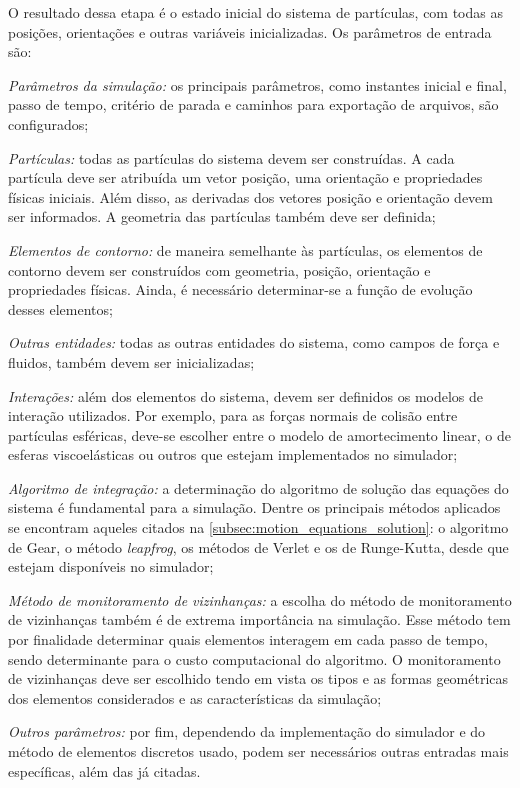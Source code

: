 O resultado dessa etapa é o estado inicial do sistema de partículas, com todas as posições, orientações e outras variáveis inicializadas. Os parâmetros de entrada são:
\begin{alineas}
\item \textit{Parâmetros da simulação:} os principais parâmetros, como instantes inicial e final, passo de tempo, critério de parada e caminhos para exportação de arquivos, são configurados;
\item \textit{Partículas:} todas as partículas do sistema devem ser construídas. A cada partícula deve ser atribuída um vetor posição, uma orientação e propriedades físicas iniciais. Além disso, as derivadas dos vetores posição e orientação devem ser informados. A geometria das partículas também deve ser definida;
\item \textit{Elementos de contorno:} de maneira semelhante às partículas, os elementos de contorno devem ser construídos com geometria, posição, orientação e propriedades físicas. Ainda, é necessário determinar-se a função de evolução desses elementos;
\item \textit{Outras entidades:} todas as outras entidades do sistema, como campos de força e fluidos, também devem ser inicializadas;
\item \textit{Interações:} além dos elementos do sistema, devem ser definidos os modelos de interação utilizados. Por exemplo, para as forças normais de colisão entre partículas esféricas, deve-se escolher entre o modelo de amortecimento linear, o de esferas viscoelásticas ou outros que estejam implementados no simulador;
\item \textit{Algoritmo de integração:} a determinação do algoritmo de solução das equações do sistema é fundamental para a simulação. Dentre os principais métodos aplicados se encontram aqueles citados na \cref{subsec:motion_equations_solution}: o algoritmo de Gear, o método \textit{leapfrog}, os métodos de Verlet e os de Runge-Kutta, desde que estejam disponíveis no simulador;
\item \textit{Método de monitoramento de vizinhanças:} a escolha do método de monitoramento de vizinhanças também é de extrema importância na simulação. Esse método tem por finalidade determinar quais elementos interagem em cada passo de tempo, sendo determinante para o custo computacional do algoritmo. O monitoramento de vizinhanças deve ser escolhido tendo em vista os tipos e as formas geométricas dos elementos considerados e as características da simulação;
\item \textit{Outros parâmetros:} por fim, dependendo da implementação do simulador e do método de elementos discretos usado, podem ser necessários outras entradas mais específicas, além das já citadas.
\end{alineas}

